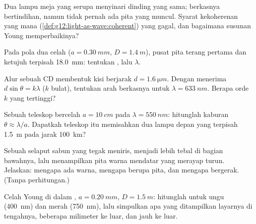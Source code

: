 \begin{exercise}[$\star\star$]\label{exo:g12:light-as-wave:8}
Dua lampu meja yang serupa menyinari dinding yang sama; berkasnya
bertindihan, namun tidak pernah ada pita yang muncul. Syarat kekoherenan
yang mana (\cref{def:g12:light-as-wave:coherent}) yang gagal, dan
bagaimana susunan Young memperbaikinya?
\end{exercise}

\begin{exercise}[$\star\star$]\label{exo:g12:light-as-wave:9}
Pada pola dua celah ($a = \qty{0.30}{mm}$, $D = \qty{1.4}{m}$), pusat
pita terang pertama dan ketujuh terpisah \qty{18.0}{mm}: tentukan , lalu $\lambda$.
\end{exercise}

\begin{exercise}[$\star\star$]\label{exo:g12:light-as-wave:10}
Alur sebuah CD membentuk kisi berjarak $d = \qty{1.6}{\micro m}$. Dengan
menerima $d \sin\theta = k\lambda$ ($k$ bulat), tentukan arah berkasnya
untuk $\lambda = \qty{633}{nm}$. Berapa orde $k$ yang tertinggi?
\end{exercise}

\begin{exercise}[$\star\star$]\label{exo:g12:light-as-wave:11}
Sebuah teleskop bercelah $a = \qty{10}{cm}$ pada
$\lambda =
\qty{550}{nm}$: hitunglah kaburan 
$\theta \approx
\lambda/a$. Dapatkah teleskop itu memisahkan dua lampu
depan yang terpisah \qty{1.5}{m} pada jarak \qty{100}{km}?
\end{exercise}

\begin{exercise}[$\star\star\star$]\label{exo:g12:light-as-wave:12}
Sebuah selaput sabun yang tegak meniris, menjadi lebih tebal di bagian
bawahnya, lalu menampilkan pita warna mendatar yang merayap turun.
Jelaskan: mengapa ada warna, mengapa berupa pita, dan mengapa bergerak.
(Tanpa perhitungan.)
\end{exercise}

\begin{exercise}[$\star\star\star$]\label{exo:g12:light-as-wave:13}
Celah Young di dalam , $a = \qty{0.20}{mm}$,
$D = \qty{1.5}{m}$: hitunglah  untuk ungu
(\qty{400}{nm}) dan merah (\qty{750}{nm}), lalu simpulkan apa yang
ditampilkan layarnya di tengahnya, beberapa milimeter ke luar, dan jauh
ke luar.
\end{exercise}

